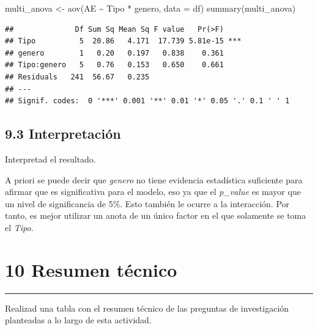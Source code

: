 \documentclass[
]{article}
\newenvironment{Shaded}{\begin{snugshade}}{\end{snugshade}}
\newcommand{\AttributeTok}[1]{\textcolor[rgb]{0.77,0.63,0.00}{#1}}
\newcommand{\FunctionTok}[1]{\textcolor[rgb]{0.00,0.00,0.00}{#1}}
\newcommand{\NormalTok}[1]{#1}
\newcommand{\OtherTok}[1]{\textcolor[rgb]{0.56,0.35,0.01}{#1}}
\newcommand{\SpecialCharTok}[1]{\textcolor[rgb]{0.00,0.00,0.00}{#1}}
\begin{document}
\begin{Shaded}
\begin{Highlighting}[]
\NormalTok{multi\_anova }\OtherTok{\textless{}{-}} \FunctionTok{aov}\NormalTok{(AE }\SpecialCharTok{\textasciitilde{}}\NormalTok{ Tipo }\SpecialCharTok{*}\NormalTok{ genero, }\AttributeTok{data =}\NormalTok{ df)}
\FunctionTok{summary}\NormalTok{(multi\_anova)}
\end{Highlighting}
\end{Shaded}

\begin{verbatim}
##              Df Sum Sq Mean Sq F value   Pr(>F)    
## Tipo          5  20.86   4.171  17.739 5.81e-15 ***
## genero        1   0.20   0.197   0.838    0.361    
## Tipo:genero   5   0.76   0.153   0.650    0.661    
## Residuals   241  56.67   0.235                     
## ---
## Signif. codes:  0 '***' 0.001 '**' 0.01 '*' 0.05 '.' 0.1 ' ' 1
\end{verbatim}

\newpage

\hypertarget{interpretaciuxf3n-3}{%
\subsection{9.3 Interpretación}\label{interpretaciuxf3n-3}}

Interpretad el resultado.

\vspace{0.3cm}

A priori se puede decir que \emph{genero} no tiene evidencia estadística
suficiente para afirmar que es significativa para el modelo, eso ya que
el \emph{p\_value} es mayor que un nivel de significancia de 5\%. Esto
también le ocurre a la interacción. Por tanto, es mejor utilizar un
anota de un único factor en el que solamente se toma el \emph{Tipo}.

\newpage

\hypertarget{resumen-tuxe9cnico}{%
\section{10 Resumen técnico}\label{resumen-tuxe9cnico}}

\begin{center}\rule{0.5\linewidth}{0.5pt}\end{center}

\vspace{0.3cm}

Realizad una tabla con el resumen técnico de las preguntas de
investigación planteadas a lo largo de esta actividad.
\end{document}
